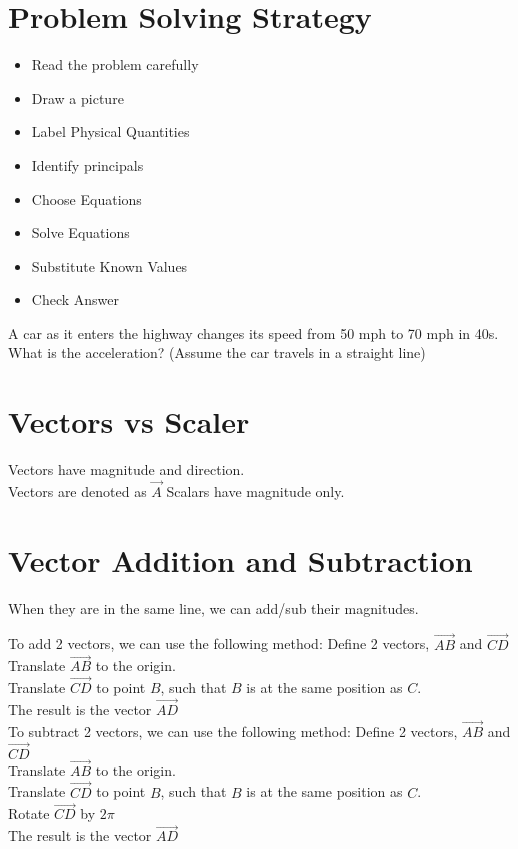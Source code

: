 \documentclass[]{article}
\begin{document}
\section*{Problem Solving Strategy}
\begin{itemize}
    \item Read the problem carefully
    \item Draw a picture
    \item Label Physical Quantities
    \item Identify principals
    \item Choose Equations
    \item Solve Equations
    \item Substitute Known Values
    \item Check Answer
\end{itemize}
\newpage
A car as it enters the highway changes its speed from 50 mph to 70 mph in 40s. What is the acceleration? (Assume the car travels in a straight line)\\

\section*{Vectors vs Scaler}
Vectors have magnitude and direction.\\
Vectors are denoted as $\overrightarrow{A}$
Scalars have magnitude only.\\

\section*{Vector Addition and Subtraction}
When they are in the same line, we can add/sub their magnitudes.

To add 2 vectors, we can use the following method:
Define 2 vectors, $\overrightarrow{AB}$ and $\overrightarrow{CD}$\\
Translate $\overrightarrow{AB}$ to the origin.\\
Translate $\overrightarrow{CD}$ to point $B$, such that $B$ is at the same position as $C$.\\
The result is the vector $\overrightarrow{AD}$\\

To subtract 2 vectors, we can use the following method:
Define 2 vectors, $\overrightarrow{AB}$ and $\overrightarrow{CD}$\\
Translate $\overrightarrow{AB}$ to the origin.\\
Translate $\overrightarrow{CD}$ to point $B$, such that $B$ is at the same position as $C$.\\
Rotate $\overrightarrow{CD}$ by $2\pi$\\
The result is the vector $\overrightarrow{AD}$\\
\end{document}

